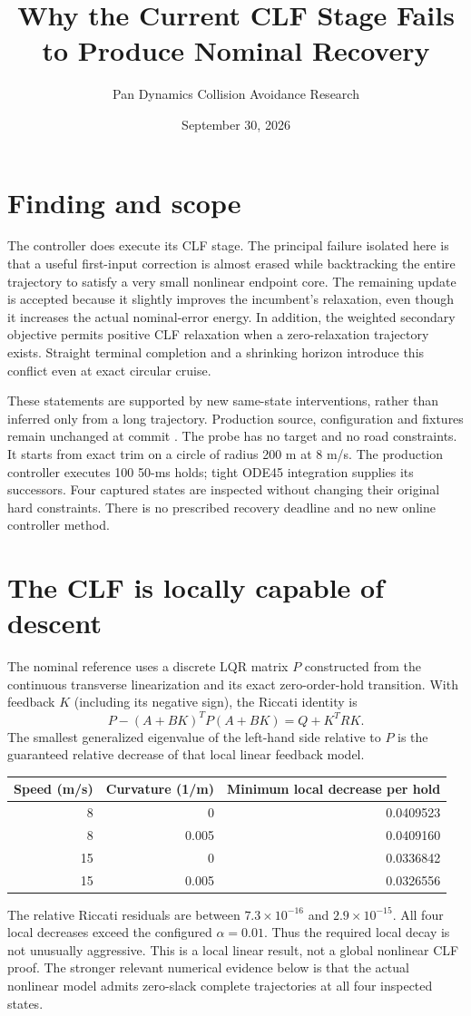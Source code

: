 \documentclass[11pt]{article}
\title{Why the Current CLF Stage Fails to Produce Nominal Recovery}
\author{Pan Dynamics Collision Avoidance Research}
\date{September 30, 2026}
\begin{document}
\maketitle

\section{Finding and scope}
The controller does execute its CLF stage. The principal failure isolated here
is that a useful first-input correction is almost erased while backtracking
the entire trajectory to satisfy a very small nonlinear endpoint core. The
remaining update is accepted because it slightly improves the incumbent's
relaxation, even though it increases the actual nominal-error energy. In
addition, the weighted secondary objective permits positive CLF relaxation
when a zero-relaxation trajectory exists. Straight terminal completion and a
shrinking horizon introduce this conflict even at exact circular cruise.

These statements are supported by new same-state interventions, rather than
inferred only from a long trajectory. Production source, configuration and
fixtures remain unchanged at commit
.
The probe has no target and no road constraints. It starts from exact trim on
a circle of radius 200 m at 8 m/s. The production controller executes 100
50-ms holds; tight ODE45 integration supplies its successors. Four captured
states are inspected without changing their original hard constraints.
There is no prescribed recovery deadline and no new online controller method.

\section{The CLF is locally capable of descent}
The nominal reference uses a discrete LQR matrix $P$ constructed from the
continuous transverse linearization and its exact zero-order-hold
transition. With feedback $K$ (including its negative sign), the Riccati
identity is
\[
P-(A+BK)^TP(A+BK)=Q+K^TRK.
\]
The smallest generalized eigenvalue of the left-hand side relative to $P$
is the guaranteed relative decrease of that local linear feedback model.
\begin{center}
\begin{tabular}{rrr}
\toprule
Speed (m/s)&Curvature (1/m)&Minimum local decrease per hold\\
\midrule
8&0&0.0409523\\
8&0.005&0.0409160\\
15&0&0.0336842\\
15&0.005&0.0326556\\
\bottomrule
\end{tabular}
\end{center}
The relative Riccati residuals are between $7.3\times10^{-16}$ and
$2.9\times10^{-15}$. All four local decreases exceed the configured
$\alpha=0.01$. Thus the required local decay is not unusually aggressive.
This is a local linear result, not a global nonlinear CLF proof. The stronger
relevant numerical evidence below is that the actual nonlinear model admits
zero-slack complete trajectories at all four inspected states.
\end{document}

